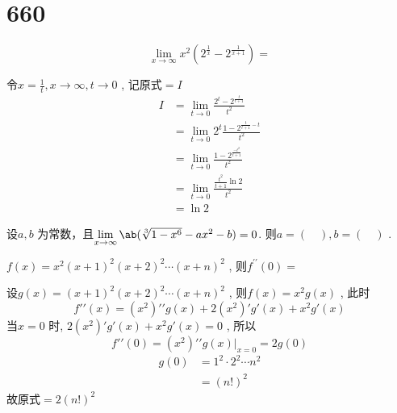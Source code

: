 \section{660}

\begin{question}
    \begin{equation*}
        \lim\limits_{x \to \infty} x^2 (2^{\frac{1}{x}} - 2^{\frac{1}{x + 1}}) = 
    \end{equation*}
\end{question}
\begin{solution}
    令$ x = \frac 1 t , x \to \infty, t \to 0 $ , 记原式$ = I $ 
    \begin{align*}
        I &= \lim\limits_{t \to 0} \frac{ 2^t - 2^{ \frac{t}{t + 1} } }{t^2} \\
          &= \lim\limits_{t \to 0} 2^t \frac{ 1 - 2^{ \frac{t}{t + 1} - t } }{t^2}  \\
          &= \lim\limits_{t \to 0} \frac{ 1 - 2^{ \frac{-t^2}{t + 1} } }{t^2}   \\
          &= \lim\limits_{t \to 0} \frac{ \frac{t^2}{t + 1} \ln2 }{t^2} \\
          &= \ln2
    \end{align*}
\end{solution}
\begin{question}
    设$ a, b $ 为常数，且$ \lim\limits_{x \to \infty} \ab(\sqrt[3]{1 - x^6} - ax^2 - b) = 0 $. 则$ a = (\quad), b = (\quad) $ . 
\end{question}
\begin{question}
    $ f(x) = x^2 (x + 1)^2 (x + 2)^2 \cdots (x + n)^2 $ , 则$ f^{\prime \prime}(0) =  $ 
\end{question}
\begin{solution}
    设$ g(x) =(x + 1)^2 (x + 2)^2 \cdots (x + n)^2 $ , 则$ f(x) = x^2 g(x) $ , 此时
    \begin{equation*}
        f\prime\prime(x) = (x^2)\prime\prime g(x) + 2(x^2)\prime g\prime(x) + x^2 g\prime(x)
    \end{equation*}
    当$ x = 0 $ 时,  $ 2(x^2)\prime g\prime(x) + x^2 g\prime(x) = 0 $ , 所以 
    \begin{equation*}
        f\prime\prime(0) = (x^2)\prime\prime g(x) | _{x = 0} = 2g(0)
    \end{equation*}
    \begin{align*}
        g(0) &= 1^2 \cdot 2^2 \cdots n^2     \\
        &= (n!)^2
    \end{align*}
    故原式$ = 2(n!)^2 $ 
\end{solution}
